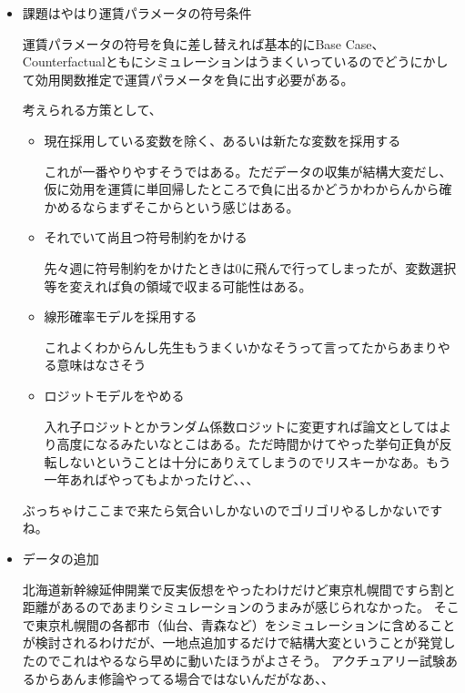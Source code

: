 \documentclass{jsarticle}
\begin{document}
\begin{itemize} %
\item 課題はやはり運賃パラメータの符号条件

運賃パラメータの符号を負に差し替えれば基本的にBase Case、Counterfactualともにシミュレーションはうまくいっているのでどうにかして効用関数推定で運賃パラメータを負に出す必要がある。

考えられる方策として、

\begin{itemize}
\item 現在採用している変数を除く、あるいは新たな変数を採用する

これが一番やりやすそうではある。ただデータの収集が結構大変だし、仮に効用を運賃に単回帰したところで負に出るかどうかわからんから確かめるならまずそこからという感じはある。

\item それでいて尚且つ符号制約をかける

先々週に符号制約をかけたときは0に飛んで行ってしまったが、変数選択等を変えれば負の領域で収まる可能性はある。

\item 線形確率モデルを採用する

これよくわからんし先生もうまくいかなそうって言ってたからあまりやる意味はなさそう

\item ロジットモデルをやめる

入れ子ロジットとかランダム係数ロジットに変更すれば論文としてはより高度になるみたいなとこはある。ただ時間かけてやった挙句正負が反転しないということは十分にありえてしまうのでリスキーかなあ。もう一年あればやってもよかったけど、、、

\end{itemize}

ぶっちゃけここまで来たら気合いしかないのでゴリゴリやるしかないですね。

\item データの追加

北海道新幹線延伸開業で反実仮想をやったわけだけど東京札幌間ですら割と距離があるのであまりシミュレーションのうまみが感じられなかった。
そこで東京札幌間の各都市（仙台、青森など）をシミュレーションに含めることが検討されるわけだが、一地点追加するだけで結構大変ということが発覚したのでこれはやるなら早めに動いたほうがよさそう。
アクチュアリー試験あるからあんま修論やってる場合ではないんだがなあ、、

\end{itemize}
\end{document}
